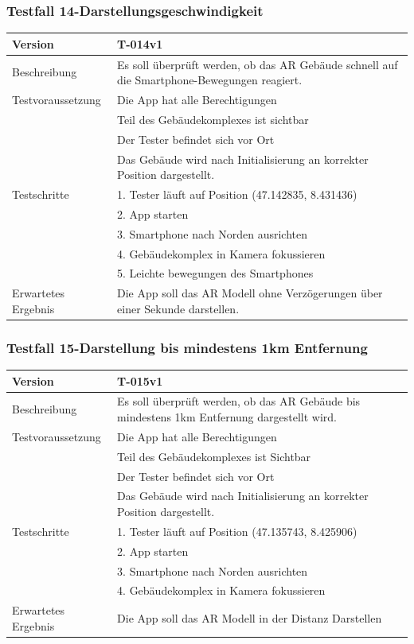 \documentclass[a4paper]{scrreprt}
\begin{document}
\subsubsection{Testfall 14-Darstellungsgeschwindigkeit}
\begin{tabularx}{\textwidth}{|l|X|}
\hline 
	Version &
	T-014v1 \\ 
\hline 
	Beschreibung & 
	Es soll überprüft werden, ob das AR Gebäude schnell auf die Smartphone-Bewegungen reagiert. \\ 
\hline 
	Testvoraussetzung &
	Die App hat alle Berechtigungen \\ &
	Teil des Gebäudekomplexes ist sichtbar \\ &
	Der Tester befindet sich vor Ort \\ &
	Das Gebäude wird nach Initialisierung an korrekter Position dargestellt. \\
\hline 
	Testschritte & 
		1. Tester läuft auf Position (47.142835, 8.431436) \\ &
		2. App starten \\ &
		3. Smartphone nach Norden ausrichten\\ &
		4. Gebäudekomplex in Kamera fokussieren\\ &
		5. Leichte bewegungen des Smartphones\\
\hline
	Erwartetes Ergebnis &
	Die App soll das AR Modell ohne Verzögerungen über einer Sekunde darstellen. \\ 
\hline 
\end{tabularx}


\subsubsection{Testfall 15-Darstellung bis mindestens 1km Entfernung}
\begin{tabularx}{\textwidth}{|l|X|}
\hline 
	Version &
	T-015v1 \\ 
\hline 
	Beschreibung & 
	Es soll überprüft werden, ob das AR Gebäude bis mindestens 1km Entfernung dargestellt wird. \\ 
\hline 
	Testvoraussetzung &
	Die App hat alle Berechtigungen \\ &
	Teil des Gebäudekomplexes ist Sichtbar \\ &
	Der Tester befindet sich vor Ort \\ &
	Das Gebäude wird nach Initialisierung an korrekter Position dargestellt. \\
\hline 
	Testschritte & 
		1. Tester läuft auf Position (47.135743, 8.425906) \\ &
		2. App starten \\ &
		3. Smartphone nach Norden ausrichten\\ &
		4. Gebäudekomplex in Kamera fokussieren\\ 
\hline
	Erwartetes Ergebnis &
	Die App soll das AR Modell in der Distanz Darstellen \\ 
\hline 
\end{tabularx}
\end{document}
